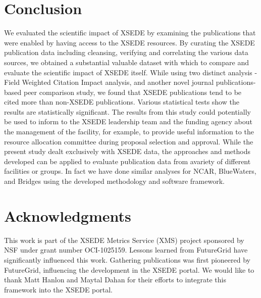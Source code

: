 \documentclass{sig-alternate}
\begin{document}
\section{Conclusion} \label{S:conclusion}

We evaluated the scientific impact of XSEDE by examining the publications that
were enabled by having access to the XSEDE resources. By curating the XSEDE publication data including
cleansing, verifying and correlating the various data sources, we obtained
 a substantial valuable dataset with which to compare and evaluate the scientific impact of XSEDE itself.
While using two distinct analysis - Field Weighted Citation Impact analysis,
and another novel journal publications-based peer comparison study, we found that
XSEDE publications tend to be cited more than non-XSEDE publications.
Various statistical tests show the results are statistically significant.
The results from this study could potentially be used to inform to the XSEDE leadership team
and the funding agency about the management
of the facility, for example, to provide useful information to the resource allocation
committee during proposal selection and approval.
While the present study dealt exclusively with XSEDE data, the approaches and methods developed can
be applied to evaluate publication data from avariety of different facilities or groups.
In fact we have done similar analyses for NCAR, BlueWaters, and Bridges using the
developed methodology and software framework.


\section{Acknowledgments}

This work is part of the XSEDE Metrics Service (XMS) project sponsored
by NSF under grant number OCI-1025159. Lessons learned from FutureGrid
have significantly influenced this work. Gathering publications was
first pioneered by FutureGrid, influencing the development in the XSEDE
portal. We would like to thank Matt Hanlon and Maytal Dahan for their
efforts to integrate this framework into the XSEDE portal.


 
 
\end{document}
